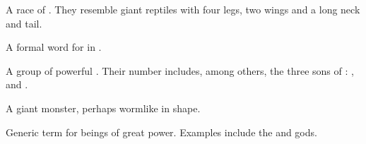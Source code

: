 \begin{gloss}
\begin{comment}
\paragraph{\dragon}
\end{comment}
\gitem{\dragon}
A race of . 
They resemble giant reptiles with four legs, two wings and a long neck and tail. 





\begin{subgloss}
  \begin{comment}
  \subparagraph{\draecchonosh}
  \end{comment}
  \gitem[\draecchonosh]{\draecchonosh}
  A formal word for \quo{\dragon} in . 
  
  
  
  
  \begin{comment}
  \subparagraph{\shaeeroth}
  \end{comment}
  \gitem[\shaeeroths]{\shaeeroth}
  A group of powerful \dragons. 
  Their number includes, among others, the three sons of : 
  , 
   and 
  . 
\end{subgloss}









\begin{comment}
\paragraph{\ghobal}
\end{comment}
\gitem[\ghobaleth]{\ghobal}
A giant monster, perhaps wormlike in shape. 









\begin{comment}
\paragraph{god}
\end{comment}
Generic term for  beings of great power. 
Examples include the  and  gods. 










\end{gloss}
